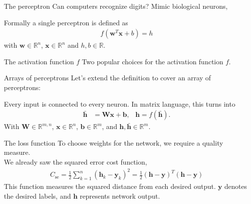 \documentclass{beamer}
\begin{document}
    \begin{frame}{The perceptron}
      Can computers recognize digits? Mimic biological neurons,
      \begin{figure}
        
      \end{figure}
      Formally a single perceptron is defined as
      \begin{align}
        f(\mathbf{w}^T \mathbf{x} + b) = h
      \end{align}
      with $\mathbf{w} \in \mathbb{R}^n$, $\mathbf{x} \in \mathbb{R}^n$ and $h,b \in \mathbb{R}$. 
    \end{frame}

    \begin{frame}{The activation function $f$}
      Two popular choices for the activation function $f$.
      \begin{figure}
        
        
      \end{figure}
    \end{frame}

    \begin{frame}{Arrays of perceptrons}
      Let's extend the definition to cover an array of perceptrons:
      \begin{figure}
        
      \end{figure}
      Every input is connected to every neuron. In matrix language, this turns into
      \begin{align}
        \bar{\mathbf{h}} &= \mathbf{W}\mathbf{x} + \mathbf{b}, & \mathbf{h} = f(\bar{\mathbf{h}}).
      \end{align}
      With $\mathbf{W} \in \mathbb{R}^{m,n}$, $\mathbf{x} \in \mathbb{R}^{n}$, $\mathbf{b} \in \mathbb{R}^{m}$, and $\mathbf{h}, \bar{\mathbf{h}} \in \mathbb{R}^m$.
    \end{frame}

    \begin{frame}{The loss function}
      To choose weights for the network, we require a quality measure. \\
      We already saw the squared error cost function,
      \begin{align}
        C_{\text{se}} = \frac{1}{2} \sum_{k=1}^{n} (\mathbf{h}_k - \mathbf{y}_k)^2 = \frac{1}{2} (\mathbf{h} - \mathbf{y})^T(\mathbf{h} - \mathbf{y})
      \end{align}
      This function measures the squared distance from each desired output.
      $\mathbf{y}$ denotes the desired labels, and $\mathbf{h}$ represents network output.
    \end{frame}
\end{document}
